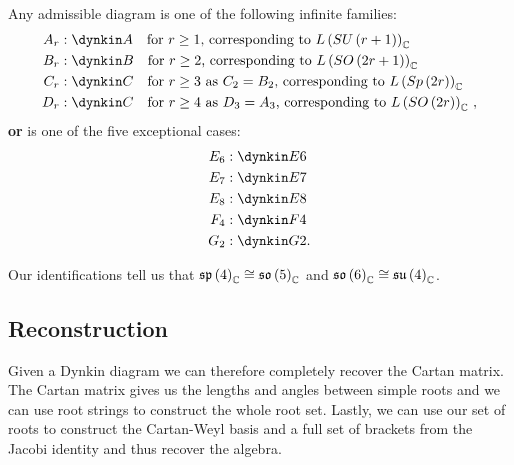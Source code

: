 \begin{theorem}
    Any admissible diagram is one of the following infinite families:
    \begin{align}
        A_r &: \dynkin A{} \quad \text{for $r \geq 1$, corresponding to $L \left( SU \left( r + 1 \right)  \right)_{\C}$} \\
        B_r &: \dynkin B{} \quad \text{for $r \geq 2$, corresponding to $L \left( SO \left( 2r + 1 \right)  \right)_{\C}$} \\
        C_r &: \dynkin C{}\quad \text{for $r \geq 3$ as $C_2 = B_2$, corresponding to $L \left( Sp \left( 2r  \right)  \right)_{\C}$ } \\
        D_r &: \dynkin C{}\quad \text{for $r \geq 4$ as $D_3 = A_3$, corresponding to $L \left( SO \left( 2r  \right)  \right)_{\C}$  }
    ,\end{align}
    \textbf{or} is one of the five exceptional cases: 
    \begin{align}
        E_6 &: \dynkin E6 \\
        E_7 &: \dynkin E7 \\
        E_8 &: \dynkin E8 \\
        F_4 &: \dynkin F4 \\
        G_2 &: \dynkin G2 
    .\end{align}
\end{theorem}

Our identifications tell us that $\mathfrak{sp}\left( 4 \right)_{\mathbb{C}} \cong \mathfrak{so}\left( 5 \right)_{\mathbb{C}}$ and $\mathfrak{so}\left( 6 \right)_{\mathbb{C}} \cong \mathfrak{su}\left( 4 \right)_{\mathbb{C}}$.

\subsection{Reconstruction}

Given a Dynkin diagram we can therefore completely recover the Cartan matrix. The Cartan matrix gives us the lengths and angles between simple roots and we can use root strings to construct the whole root set. Lastly, we can use our set of roots to construct the Cartan-Weyl basis and a full set of brackets from the Jacobi identity and thus recover the algebra.



